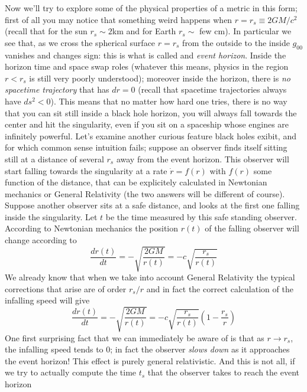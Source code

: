 Now we'll try to explore some of the physical properties of a metric in this form; first of all you may notice that something weird happens when $r=r_s\equiv 2GM/c^2$ (recall that for the sun $r_s\sim 2$km and for Earth $r_s\sim$ few cm). In particular we see that, as we cross the spherical surface $r=r_s$ from the outside to the inside $g_{00}$ vanishes and changes sign: this is what is called and \textit{event horizon}. Inside the horizon time and space swap roles (whatever this means, physics in the region $r<r_s$ is still very poorly understood); moreover inside the horizon, there is \textit{no spacetime trajectory} that has $dr=0$ (recall that spacetime trajectories always have $ds^2<0$). This means that no matter how hard one tries, there is no way that you can sit still inside a black hole horizon, you will always fall towards the center and hit the singularity, even if you sit on a spaceship whose engines are infinitely powerful. Let's examine another curious feature black holes exibit, and for which common sense intuition fails; suppose an observer finds itself sitting still at a distance of several $r_s$ away from the event horizon. This observer will start falling towards the singularity at a rate $\dot{r}=f(r)$ with $f(r)$ some function of the distance, that can be explicitely calculated in Newtonian mechanics or General Relativity (the two answers will be different of course). Suppose another observer sits at a safe distance, and looks at the first one falling inside the singularity. Let $t$ be the time measured by this safe standing observer. According to Newtonian mechanics the position $r(t)$ of the falling observer will change according to 
\begin{equation}
\frac{dr(t)}{dt}=-\sqrt{\frac{2GM}{r(t)}}=-c\sqrt{\frac{r_s}{r(t)}}
\end{equation}
We already know that when we take into account General Relativity the typical corrections that arise are of order $r_s/r$ and in fact the correct calculation of the infalling speed will give
\begin{equation}
\frac{dr(t)}{dt}=-\sqrt{\frac{2GM}{r(t)}}=-c\sqrt{\frac{r_s}{r(t)}}\left(1-\frac{r_s}{r}\right)
\end{equation}
One first surprising fact that we can immediately be aware of is that as $r\rightarrow r_s$, the infalling speed tends to 0; in fact the observer \textit{slows down} as it approaches the event horizon! This effect is purely general relativistic. And this is not all, if we try to actually compute the time $t_s$ that the observer takes to reach the event horizon
